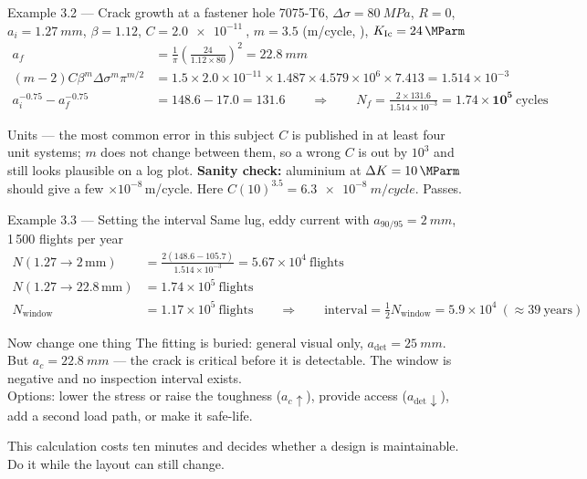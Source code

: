 \documentclass[aspectratio=169,10pt]{beamer}
\begin{document}
\begin{frame}{Example 3.2 --- Crack growth at a fastener hole}
7075-T6, $\Delta\sigma=\SI{80}{MPa}$, $R=0$, $a_i=\SI{1.27}{mm}$, $\beta=1.12$, $C=\SI{2.0e-11}{}$, $m=3.5$ (\si{m/cycle}, \si{\MParm}), $K_{\mathrm{Ic}}=\SI{24}{\MParm}$
\begin{align*}
a_f&=\frac{1}{\pi}\left(\frac{24}{1.12\times80}\right)^{2}=\SI{22.8}{mm}\\
(m-2)C\beta^m\Delta\sigma^m\pi^{m/2}&=1.5\times2.0{\times}10^{-11}\times1.487\times4.579{\times}10^{6}\times7.413=1.514{\times}10^{-3}\\
a_i^{-0.75}-a_f^{-0.75}&=148.6-17.0=131.6
\qquad\Rightarrow\qquad N_f=\frac{2\times131.6}{1.514{\times}10^{-3}}=\mathbf{1.74\times10^{5}}\ \text{cycles}
\end{align*}
\begin{alertblock}{Units --- the most common error in this subject}
\footnotesize $C$ is published in at least four unit systems; $m$ does not change between them, so a wrong $C$ is out by $10^3$ and still looks plausible on a log plot. \textbf{Sanity check:} aluminium at $\Delta K=\SI{10}{\MParm}$ should give a few $\times10^{-8}$\,m/cycle. Here $C(10)^{3.5}=\SI{6.3e-8}{m/cycle}$. Passes.
\end{alertblock}
\end{frame}

\begin{frame}{Example 3.3 --- Setting the interval}
Same lug, eddy current with $a_{90/95}=\SI{2}{mm}$, 1\,500 flights per year
\begin{align*}
N(1.27\to2\,\text{mm})&=\frac{2(148.6-105.7)}{1.514\times10^{-3}}=5.67\times10^{4}\ \text{flights}\\
N(1.27\to22.8\,\text{mm})&=1.74\times10^{5}\ \text{flights}\\
N_{\mathrm{window}}&=1.17\times10^{5}\ \text{flights}
\qquad\Rightarrow\qquad \text{interval}=\tfrac12 N_{\mathrm{window}}=5.9\times10^{4}\ (\approx39\ \text{years})
\end{align*}
\begin{alertblock}{Now change one thing}
The fitting is buried: general visual only, $a_{\mathrm{det}}=\SI{25}{mm}$. But $a_c=\SI{22.8}{mm}$ --- the crack is \alert{critical before it is detectable}. The window is negative and \alert{no inspection interval exists}.\\[2pt]
Options: lower the stress or raise the toughness ($a_c\uparrow$), provide access ($a_{\mathrm{det}}\downarrow$), add a second load path, or make it safe-life.
\end{alertblock}
\scriptsize This calculation costs ten minutes and decides whether a design is maintainable. Do it while the layout can still change.
\end{frame}
\end{document}

